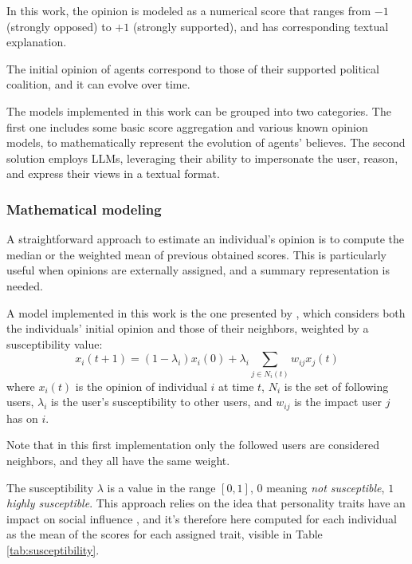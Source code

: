 In this work, the opinion is modeled as a numerical score that ranges from $-1$ (strongly opposed) to $+1$ (strongly supported), and has corresponding textual explanation.

The initial opinion of agents correspond to those of their supported political coalition, and it can evolve over time.

\medskip
The models implemented in this work can be grouped into two categories.
The first one includes some basic score aggregation and various known opinion models, to mathematically represent the evolution of agents' believes.
The second solution employs LLMs, leveraging their ability to impersonate the user, reason, and express their views in a textual format.


\subsubsection{Mathematical modeling}
A straightforward approach to estimate an individual's opinion is to compute the median or the weighted mean of previous obtained scores.
This is particularly useful when opinions are externally assigned, and a summary representation is needed.

\medskip
A model implemented in this work is the one presented by \citet{friedkin_1990}, which considers both the individuals' initial opinion and those of their neighbors, weighted by a susceptibility value:
\[
x_i(t + 1) = (1 - \lambda_i) x_i(0) + \lambda_i   \sum_{j \in N_i(t)} w_{ij} x_j(t)
\]
where $x_i(t)$ is the opinion of individual $i$ at time $t$, $N_i$ is the set of following users, $\lambda_i$ is the user's susceptibility to other users, and $w_{ij}$ is the impact user $j$ has on $i$. 

Note that in this first implementation only the followed users are considered neighbors, and they all have the same weight.

The susceptibility $\lambda$ is a value in the range $[0,1]$, $0$ meaning \textit{not susceptible}, $1$ \textit{highly susceptible}.
This approach relies on the idea that personality traits have an impact on social influence \cite{oyibo2019personality}, and it's therefore here computed for each individual as the mean of the scores for each assigned trait, visible in Table \ref{tab:susceptibility}.

